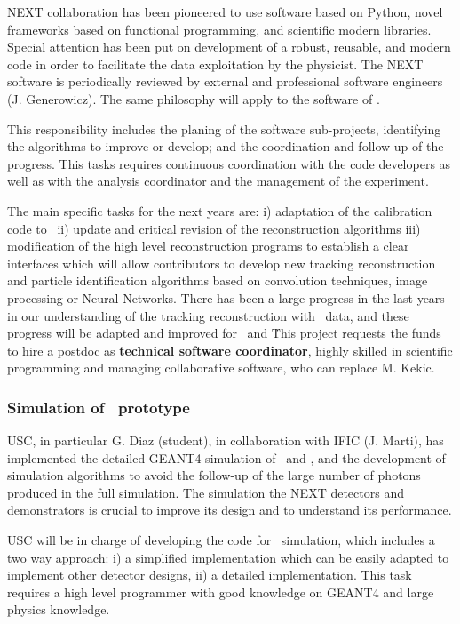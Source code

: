 NEXT collaboration has been pioneered to use software based on Python, novel frameworks based on functional programming, and scientific modern libraries. Special attention has been put on development of a robust, reusable, and modern code in order to facilitate the data exploitation by the physicist. The NEXT software is periodically reviewed by external and professional software engineers (J. Generowicz). The same philosophy will apply to the software of \HDEMO.

This responsibility includes the planing of the software sub-projects, identifying the algorithms to improve or develop; and the coordination and follow up of the progress. This tasks requires continuous coordination with the code developers as well as with the analysis coordinator and the management of the experiment.

The main specific tasks for the next years are: i) adaptation of the calibration code to \Next\ ii) update and critical revision of the reconstruction algorithms iii) modification of the high level reconstruction programs to establish a clear interfaces which will allow contributors to develop new tracking reconstruction and particle identification algorithms based on convolution techniques, image processing or Neural Networks. There has been a large progress in the last years in our understanding of the tracking reconstruction with \NEW\ data, and these progress will be adapted and improved for \NEXT\ and \HD\.

This project requests the funds to hire a postdoc as {\bf technical software coordinator}, highly skilled in scientific programming and managing collaborative software, who can replace M. Kekic. 

\subsubsection{Simulation of \HDEMO\ prototype}

USC, in particular G. Diaz (student), in collaboration with IFIC (J. Marti), has implemented the detailed GEANT4 simulation of \New\ and \Next, and the development of simulation algorithms to avoid the follow-up of the large number of photons produced in the full simulation. The simulation the NEXT detectors and demonstrators is crucial to improve its design and to understand its performance. 

USC will be in charge of developing the code for \HDEMO\ simulation, which includes a two way approach: i) a simplified implementation which can be easily adapted to implement other detector designs, ii) a detailed \HDEMO implementation. This task requires a high level programmer with good knowledge on GEANT4 and large physics knowledge. 


